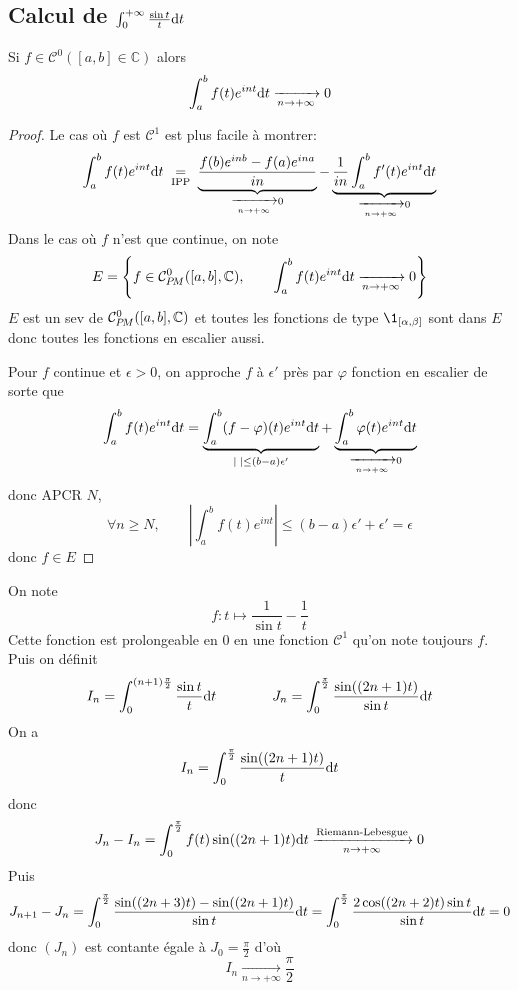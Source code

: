 \subsection{Calcul de $\int_0^{+\infty}\frac{\sin t}t\mathrm{d} t$}

\begin{res}
    Si $f\in\mathcal C^0([a, b]\in\mathbb C)$ alors \[
        \int_a^bf(t)e^{int}\mathrm{d} t\xrightarrow[n\to+\infty]{}0
    \]
\end{res}

\begin{proof}
    Le cas où $f$ est $\mathcal C^1$ est plus facile à montrer: \[
        \int_a^bf(t)e^{int}\mathrm{d} t\underset{\text{ IPP }}=\underbrace{\frac{f(b)e^{inb}-f(a)e^{ina}}{in}}_{\xrightarrow[n\to+\infty]{}0}- \underbrace{\frac1{in}\int_a^bf'(t)e^{int}\mathrm{d} t}_{\xrightarrow[n\to+\infty]{}0}
    \]
    Dans le cas où $f$ n'est que continue, on note \[
        E = \left\{ f\in \CPM([a, b], \mathbb C), \qquad \int_a^bf(t)e^{int}\diff t\xrightarrow[n\to+\infty]{}0 \right\}
    \]
    $E$ est un sev de $\CPM([a, b], \mathbb C)$ et toutes les fonctions de type $\1_{[\alpha, \beta]}$ sont dans $E$ donc toutes les fonctions en escalier aussi.

    Pour $f$ continue et $\epsilon>0$, on approche $f$ à $\epsilon'$ près par $\varphi$ fonction en escalier de sorte que \[
        \int_a^bf(t)e^{int}\mathrm{d} t=\underbrace{\int_a^b(f-\varphi)(t)e^{int}\mathrm{d} t}_{|\;|\leq (b-a)\epsilon'}+\underbrace{\int_a^b\varphi(t)e^{int}\mathrm{d} t}_{\xrightarrow[n\to+\infty]{}0}
    \]
    donc APCR $N$, \[
        \forall n\geq N, \qquad \left|\int_a^bf(t)e^{int}\right|\leq (b-a)\epsilon'+\epsilon'=\epsilon
    \]
    donc $f\in E$
\end{proof}

On note \[
    f:t\longmapsto \frac1{\sin t}-\frac1t
\]
Cette fonction est prolongeable en $0$ en une fonction $\mathcal C^1$ qu'on note toujours $f$. Puis on définit \[
    I_n=\int_0^{(n+1)\frac\pi2}\frac{\sin t}t\mathrm{d} t\qquad \qquad J_n=\int_0^{\frac\pi2}\frac{\sin((2n+1)t)}{\sin t}\mathrm{d} t
\]
On a \[
    I_n=\int_0^{\frac\pi2}\frac{\sin((2n+1)t)}{t}\mathrm{d} t
\]
donc \[
    J_n-I_n=\int_0^{\frac\pi2}f(t)\sin((2n+1)t)\mathrm{d} t\xrightarrow[n\to+\infty]{\text{Riemann-Lebesgue}}0
\]
Puis \[
    J_{n+1}-J_n=\int_0^{\frac\pi2}\frac{\sin((2n+3)t)-\sin((2n+1)t)}{\sin t}\mathrm{d} t=\int_0^{\frac\pi2}\frac{2\cos((2n+2)t)\sin t}{\sin t}\mathrm{d} t=0
\]
donc $(J_n)$ est contante égale à $J_0=\frac\pi2$ d'où \[
    I_n\xrightarrow[n\to+\infty]{}\frac\pi2
\]


